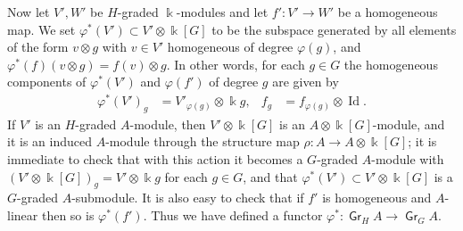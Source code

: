 \documentclass[11pt,fleqn]{article}
\newcommand\ot{\otimes}
\renewcommand\to{\longrightarrow}
\renewcommand\phi{\varphi}
\renewcommand\k{\Bbbk}
\DeclareMathOperator\Gr{\mathsf{Gr}}
\DeclareMathOperator\Id{Id}
\begin{document}
Now let $V',W'$ be $H$-graded $\k$-modules and let $f': V' \to W'$ be a 
homogeneous map. We set $\phi^*(V') \subset V' \ot \k[G]$ to be the 
subspace generated by all elements of the form $v \ot g$ with $v \in V'$ 
homogeneous of degree $\phi(g)$, and $\phi^*(f)(v \ot g) = f(v) \ot g$. In 
other words, for each $g \in G$ the homogeneous components of $\phi^*(V')$
and $\phi(f')$ of degree $g$ are given by
\begin{align*}
\phi^*(V')_g 
 &= V'_{\phi(g)} \ot \k g,
 &f_g
 &= f_{\phi(g)} \ot \Id.
\end{align*}
If $V'$ is an $H$-graded $A$-module, then $V' \ot \k[G]$ is an $A \ot 
\k[G]$-module, and it is an induced $A$-module through the structure map 
$\rho: A \to A \ot \k[G]$; it is immediate to check that with this action it 
becomes a $G$-graded $A$-module with $(V' \ot \k[G])_g = V' \ot \k g$ for 
each $g \in G$, and that $\phi^*(V') \subset V' \ot \k[G]$ is a $G$-graded 
$A$-submodule. It is also easy to check that if $f'$ is homogeneous and 
$A$-linear then so is $\phi^*(f')$. Thus we have defined a functor $\phi^*: 
\Gr_H A \to \Gr_G A$.
\end{document}
